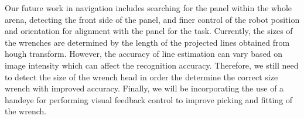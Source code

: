 Our future work in navigation includes searching for the panel within
the whole arena, detecting the front side of the panel, and finer
control of the robot position and orientation for alignment with the
panel for the task. Currently, the sizes of the wrenches are
determined by the length of the projected lines obtained from hough
transform. However, the accuracy of line estimation can vary based on
image intensity which can affect 
the recognition accuracy.
 Therefore, we still need to detect the
size of the wrench head in order the determine the correct size
wrench with improved accuracy. Finally, we will be incorporating
the use of a handeye for performing visual feedback control to improve
picking and fitting of the wrench.

